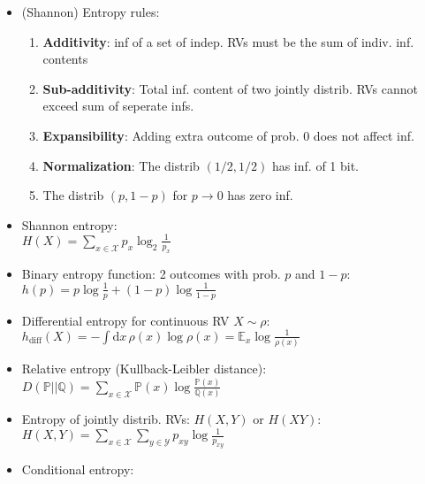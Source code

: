 \documentclass[a4wide, 10pt]{article}
\begin{document}
\begin{itemize}
	\item (Shannon) Entropy rules:
		\begin{enumerate}
			\item \textbf{Additivity}: inf of a set of indep. RVs must be the sum of indiv. inf. contents 
			\item \textbf{Sub-additivity}: Total inf. content of two jointly distrib. RVs cannot exceed sum of seperate infs.
			\item \textbf{Expansibility}: Adding extra outcome of prob. 0 does not affect inf.
			\item \textbf{Normalization}: The distrib $(1/2,1/2)$ has inf. of 1 bit.
			\item The distrib $(p, 1-p)$ for $p \to 0$ has zero inf.
		\end{enumerate}

	\item Shannon entropy:\\
	$H(X) = \sum_{x \in \mathcal{X}} p_x \log_2 \frac{1}{p_x}$

	\item Binary entropy function: 2 outcomes with prob. $p$ and $1-p$: \\
	$h(p) = p \log \frac{1}{p} + (1 - p) \log \frac{1}{1-p}$

	\item Differential entropy for continuous RV $X \sim \rho$:\\
	$h_{\text{diff}}(X) = - \int \mathrm{d}x\, \rho(x) \log \rho(x) = \mathbb{E}_x \log \frac{1}{\rho(x)}$

	\item Relative entropy (Kullback-Leibler distance): \\
	$D(\mathbb{P}||\mathbb{Q}) = \sum_{x \in \mathcal{X}} \mathbb{P}(x) \log \frac{\mathbb{P}(x)}{\mathbb{Q}(x)}$

	\item Entropy of jointly distrib. RVs: $H(X,Y)$ or $H(XY)$: \\
	$H(X,Y) = \sum_{x \in \mathcal{X}} \sum_{y \in \mathcal{Y}} p_{xy} \log \frac{1}{p_{xy}}$

	\item Conditional entropy:
	


\end{itemize}
\end{document}
